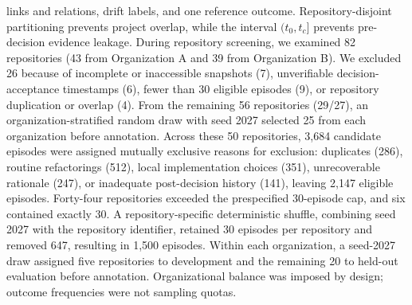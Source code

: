 \documentclass[10pt,conference]{IEEEtran}
\begin{document}
links and relations, drift labels, and one reference outcome. Repository-disjoint partitioning prevents project overlap, while the interval $(t_0,t_c]$ prevents pre-decision evidence leakage. During repository screening, we examined 82 repositories (43 from Organization A and 39 from Organization B). We excluded 26 because of incomplete or inaccessible snapshots (7), unverifiable decision-acceptance timestamps (6), fewer than 30 eligible episodes (9), or repository duplication or overlap (4). From the remaining 56 repositories (29/27), an organization-stratified random draw with seed 2027 selected 25 from each organization before annotation. Across these 50 repositories, 3,684 candidate episodes were assigned mutually exclusive reasons for exclusion: duplicates (286), routine refactorings (512), local implementation choices (351), unrecoverable rationale (247), or inadequate post-decision history (141), leaving 2,147 eligible episodes. Forty-four repositories exceeded the prespecified 30-episode cap, and six contained exactly 30. A repository-specific deterministic shuffle, combining seed 2027 with the repository identifier, retained 30 episodes per repository and removed 647, resulting in 1,500 episodes. Within each organization, a seed-2027 draw assigned five repositories to development and the remaining 20 to held-out evaluation before annotation. Organizational balance was imposed by design; outcome frequencies were not sampling quotas.
\end{document}
